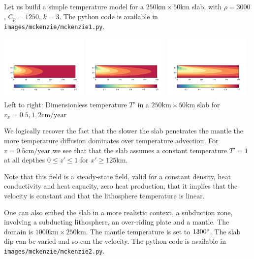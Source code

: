Let us build a simple temperature model for a $250\text{km}\times 50\text{km}$ slab, 
with $\rho=3000$, $C_p=1250$, $k=3$. The python code is available in {\tt images/mckenzie/mckenzie1.py}.

\begin{center}
\includegraphics[width=0.32\textwidth]{images/mckenzie/temperature_vel0p5.pdf}
\includegraphics[width=0.32\textwidth]{images/mckenzie/temperature_vel1.pdf}
\includegraphics[width=0.32\textwidth]{images/mckenzie/temperature_vel2.pdf}\\
{\captionfont Left to right: Dimensionless temperature $T'$ in a $250\text{km}\times 50\text{km}$ slab 
for $v_x={0.5,1,2}\text{cm/year}$}
\end{center}

We logically recover the fact that the slower the slab penetrates the mantle the more 
temperature diffusion dominates over temperature advection. For $v=0.5\text{cm/year}$ we see that 
that the slab assumes a constant temperature $T'=1$ at all depthes $0\leq z' \leq 1$ for 
$x'\geq 125\text{km}$. 

Note that this field is a steady-state field, valid for a constant density, heat conductivity and 
heat capacity, zero heat production, that it implies that the velocity is constant and that the 
lithosphere temperature is linear. 

One can also embed the slab in a more realistic context, a subduction zone, involving a 
subducting lithosphere, an over-riding plate and a mantle. The domain is $1000\text{km}\times 250\text{km}$.
The mantle temperature is set to $1300\degree$. The slab dip can be varied and so can the 
velocity. The python code is available in {\tt images/mckenzie/mckenzie2.py}.

